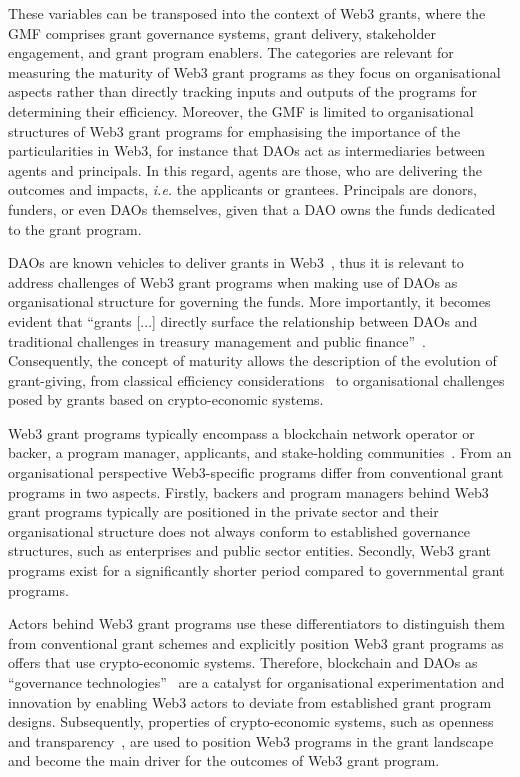 \documentclass[conference]{IEEEtran}
\begin{document}
These variables can be transposed into the context of Web3 grants, where the GMF comprises grant governance systems, grant delivery, stakeholder engagement, and grant program enablers. The categories are relevant for measuring the maturity of Web3 grant programs as they focus on organisational aspects rather than directly tracking inputs and outputs of the programs for determining their efficiency. Moreover, the GMF is limited to organisational structures of Web3 grant programs for emphasising the importance of the particularities in Web3, for instance that DAOs act as intermediaries between agents and principals. In this regard, agents are those, who are delivering the outcomes and impacts, \textit{i.e.} the applicants or grantees. Principals are donors, funders, or even DAOs themselves, given that a DAO owns the funds dedicated to the grant program.

DAOs are known vehicles to deliver grants in Web3~\cite{austgen_dao_2023}, thus it is relevant to address challenges of Web3 grant programs when making use of DAOs as organisational structure for governing the funds. More importantly, it becomes evident that ``grants [...] directly surface the relationship between DAOs and traditional challenges in treasury management and public finance''~\cite[p.~27]{tan_open_2023}. Consequently, the concept of maturity allows the description of the evolution of grant-giving, from classical efficiency considerations~\cite{holmstrom_agency_1989} to organisational challenges posed by grants based on crypto-economic systems.

Web3 grant programs typically encompass a blockchain network operator or backer, a program manager, applicants, and stake-holding communities~\cite{gilbert_sustainable_2019,howell_financing_2017}. From an organisational perspective Web3-specific programs differ from conventional grant programs in two aspects. Firstly, backers and program managers behind Web3 grant programs typically are positioned in the private sector and their organisational structure does not always conform to established governance structures, such as enterprises and public sector entities. Secondly, Web3 grant programs exist for a significantly shorter period compared to governmental grant programs. 

Actors behind Web3 grant programs use these differentiators to distinguish them from conventional grant schemes and explicitly position Web3 grant programs as offers that use crypto-economic systems. Therefore, blockchain and DAOs as ``governance technologies''~\cite{brekke_hacker-engineers_2021,shermin_disrupting_2017}  are a catalyst for organisational experimentation and innovation by enabling Web3 actors to deviate from established grant program designs. Subsequently, properties of crypto-economic systems, such as openness and transparency~\cite[p.~54]{santos_dao_2018}, are used to position Web3 programs in the grant landscape and become the main driver for the outcomes of Web3 grant program.
\end{document}
